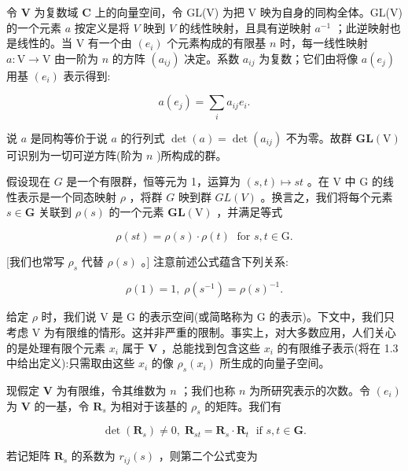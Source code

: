 \documentclass[10pt]{article}
\begin{document}
令 \(\mathbf{V}\) 为复数域 \(\mathbf{C}\) 上的向量空间，令 GL(V) 为把 V 映为自身的同构全体。GL(V) 的一个元素 \(a\) 按定义是将 \(V\) 映到 \(V\) 的线性映射，且具有逆映射 \({a}^{-1}\) ；此逆映射也是线性的。当 \(\mathrm{V}\) 有一个由 \(\left( {e}_{i}\right)\) 个元素构成的有限基 \(n\) 时，每一线性映射 \(a : \mathrm{V} \rightarrow  \mathrm{V}\) 由一阶为 \(n\) 的方阵 \(\left( {a}_{ij}\right)\) 决定。系数 \({a}_{ij}\) 为复数；它们由将像 \(a\left( {e}_{j}\right)\) 用基 \(\left( {e}_{i}\right)\) 表示得到:

\[
a\left( {e}_{j}\right)  = \mathop{\sum }\limits_{i}{a}_{ij}{e}_{i}.
\]

说 \(a\) 是同构等价于说 \(a\) 的行列式 \(\det \left( a\right)  = \det \left( {a}_{ij}\right)\) 不为零。故群 \(\mathbf{{GL}}\left( \mathrm{V}\right)\) 可识别为一切可逆方阵(阶为 \(n\) )所构成的群。

假设现在 \(G\) 是一个有限群，恒等元为 1，运算为 \(\left( {s,t}\right)  \mapsto  {st}\) 。在 \(\mathrm{V}\) 中 \(\mathrm{G}\) 的线性表示是一个同态映射 \(\rho\) ，将群 \(G\) 映到群 \({GL}\left( V\right)\) 。换言之，我们将每个元素 \(s \in  \mathbf{G}\) 关联到 \(\rho \left( s\right)\) 的一个元素 \(\mathbf{{GL}}\left( \mathrm{V}\right)\) ，并满足等式

\[
\rho \left( {st}\right)  = \rho \left( s\right)  \cdot  \rho \left( t\right) \;\text{ for }s,t \in  \mathrm{G}.
\]

[我们也常写 \({\rho }_{s}\) 代替 \(\rho \left( s\right)\) 。] 注意前述公式蕴含下列关系:

\[
\rho \left( 1\right)  = 1,\;\rho \left( {s}^{-1}\right)  = \rho {\left( s\right) }^{-1}.
\]

给定 \(\rho\) 时，我们说 \(\mathrm{V}\) 是 \(\mathrm{G}\) 的表示空间(或简略称为 G 的表示)。下文中，我们只考虑 V 为有限维的情形。这并非严重的限制。事实上，对大多数应用，人们关心的是处理有限个元素 \({x}_{i}\) 属于 \(\mathbf{V}\) ，总能找到包含这些 \({x}_{i}\) 的有限维子表示(将在 1.3 中给出定义):只需取由这些 \({x}_{i}\) 的像 \({\rho }_{s}\left( {x}_{i}\right)\) 所生成的向量子空间。

现假定 \(\mathbf{V}\) 为有限维，令其维数为 \(n\) ；我们也称 \(n\) 为所研究表示的次数。令 \(\left( {e}_{i}\right)\) 为 \(\mathbf{V}\) 的一基，令 \({\mathbf{R}}_{s}\) 为相对于该基的 \({\rho }_{s}\) 的矩阵。我们有

\[
\det \left( {\mathbf{R}}_{s}\right)  \neq  0,\;{\mathbf{R}}_{st} = {\mathbf{R}}_{s} \cdot  {\mathbf{R}}_{t}\;\text{ if }s,t \in  \mathbf{G}.
\]

若记矩阵 \({\mathbf{R}}_{s}\) 的系数为 \({r}_{ij}\left( s\right)\) ，则第二个公式变为
\end{document}
